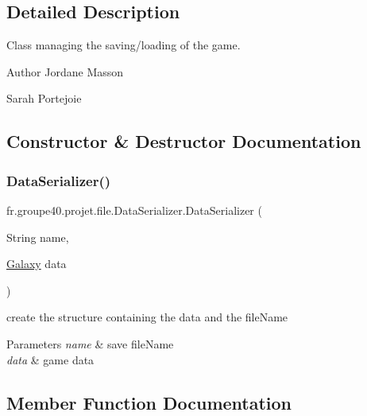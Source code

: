 \subsection{Detailed Description}
Class managing the saving/loading of the game. 

\begin{DoxyAuthor}{Author}
Jordane Masson 

Sarah Portejoie 
\end{DoxyAuthor}


\subsection{Constructor \& Destructor Documentation}
\mbox{\label{classfr_1_1groupe40_1_1projet_1_1file_1_1_data_serializer_a6424f3371fa177b49444b47882ddc776}} 
\subsubsection{\texorpdfstring{Data\+Serializer()}{DataSerializer()}}
{\footnotesize\ttfamily fr.\+groupe40.\+projet.\+file.\+Data\+Serializer.\+Data\+Serializer (\begin{DoxyParamCaption}\item[{String}]{name,  }\item[{\hyperlink{classfr_1_1groupe40_1_1projet_1_1model_1_1board_1_1_galaxy}{Galaxy}}]{data }\end{DoxyParamCaption})}



create the structure containing the data and the file\+Name 


\begin{DoxyParams}{Parameters}
{\em name} & save file\+Name \\
\hline
{\em data} & game data \\
\hline
\end{DoxyParams}


\subsection{Member Function Documentation}
\mbox{\label{classfr_1_1groupe40_1_1projet_1_1file_1_1_data_serializer_aee21aaad042ebf0a5e6eb43f2844cecc}} 
